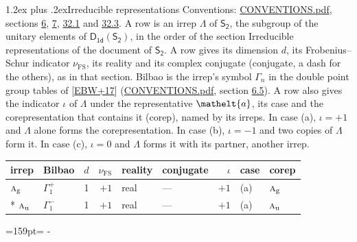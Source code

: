 \documentclass[10pt,a4paper]{article}
\makeatletter
\renewcommand\section{\@startsection{section}{1}{\z@}{-3ex plus -1ex minus -.2ex}%
  {1.2ex plus .2ex}{\normalfont\large\sffamily\bfseries\color{parttitle}}}
\newcommand{\needspace}[1]{\par\penalty-100\begingroup\dimen0=#1\relax\dimen2=\pagegoal
  \advance\dimen2-\pagetotal\ifdim\dimen0>\dimen2\relax\ifdim\dimen2>0pt\vfil\break\fi\fi
  \endgroup}
\numberwithin{equation}{section}
\newcommand{\eltfont}[1]{{\let\sigma\eltsigma\mathelt{#1}}}
\newcommand{\grp}[1]{\mathsf{#1}}
\newcommand{\irr}[1]{\text{\normalfont\scshape #1}}
\newcommand{\elt}[1]{\eltfont{#1}}
\newcommand{\ptag}[1]{\mathrm{#1}}
\newcommand{\fsind}{\nu_{\mathrm{FS}}}
\makeatother
\begin{document}
\section{Irreducible representations}\label{s:irreps}
Conventions: \href{../../CONVENTIONS.pdf}{CONVENTIONS.pdf}, sections \href{../../../rotation/CONVENTIONS.pdf\#conv.6}{6}, \href{../../../rotation/CONVENTIONS.pdf\#conv.7}{7}, \href{../../CONVENTIONS.pdf\#conv.32.1}{32.1} and \href{../../CONVENTIONS.pdf\#conv.32.3}{32.3}.
\leavevmode\label{n:irrep.Delta}A row is an irrep $\Lambda$ of $\grp{S_{2}}$, the subgroup of the unitary elements of $\grp{D_{1d}}(\grp{S_{2}})$, in the order of the section Irreducible representations of the document of \href{../../../rotation/data/pdf/S2.pdf}{$\grp{S_{2}}$}. \label{n:index.dimension}\label{n:index.frobenius}\label{n:head.irrep}\label{n:head.reality}\label{n:head.conjugate}A row gives its dimension $d$, its Frobenius--Schur indicator $\fsind$, its reality and its complex conjugate (conjugate, a dash for the others), as in that section. \label{n:head.bilbao}\label{n:irrep.alias.gamma}Bilbao is the irrep's symbol $\Gamma_n$ in the double point group tables of [\href{../../../REFERENCES.pdf\#ref.EBW+17}{EBW+17}] (\href{../../CONVENTIONS.pdf}{CONVENTIONS.pdf}, section \href{../../../rotation/CONVENTIONS.pdf\#conv.6.5}{6.5}). \label{n:head.case.corep}\label{n:head.corep}A row also gives the indicator $\iota$ of $\Lambda$ under the representative $\elt{a}$, its case and the corepresentation that contains it (corep), named by its irreps. In case (a), $\iota = +1$ and $\Lambda$ alone forms the corepresentation. In case (b), $\iota = -1$ and two copies of $\Lambda$ form it. In case (c), $\iota = 0$ and $\Lambda$ forms it with its partner, another irrep.
\setlength{\emergencystretch}{2em}\par\setlength{\emergencystretch}{0pt}
{\small\renewcommand{\arraystretch}{1.25}\setlength{\tabcolsep}{4pt}\begin{longtable}{@{}llrrllrll@{}}\toprule
irrep & Bilbao & $d$ & $\fsind$ & reality & conjugate & $\iota$ & case & corep\\\midrule\endhead
\bottomrule\endfoot\endlastfoot
$\irr{a}_{\ptag{g}}$ & $\Gamma_{1}^{+}$ & 1 & $+1$ & real & --- & $+1$ & (a) & $\irr{a}_{\ptag{g}}$\\*
$\irr{a}_{\ptag{u}}$ & $\Gamma_{1}^{-}$ & 1 & $+1$ & real & --- & $+1$ & (a) & $\irr{a}_{\ptag{u}}$\\
\bottomrule\end{longtable}}
\needspace{159pt}
\end{document}
